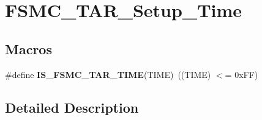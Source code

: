 \hypertarget{group___f_s_m_c___t_a_r___setup___time}{}\section{F\+S\+M\+C\+\_\+\+T\+A\+R\+\_\+\+Setup\+\_\+\+Time}
\label{group___f_s_m_c___t_a_r___setup___time}
\subsection*{Macros}
\begin{DoxyCompactItemize}
\item 
\hypertarget{group___f_s_m_c___t_a_r___setup___time_ga5b9e0f64c44ab68afca90cd28dedd8e3}{}\#define {\bfseries I\+S\+\_\+\+F\+S\+M\+C\+\_\+\+T\+A\+R\+\_\+\+T\+I\+M\+E}(T\+I\+M\+E)~((T\+I\+M\+E) $<$= 0x\+F\+F)\label{group___f_s_m_c___t_a_r___setup___time_ga5b9e0f64c44ab68afca90cd28dedd8e3}

\end{DoxyCompactItemize}


\subsection{Detailed Description}
